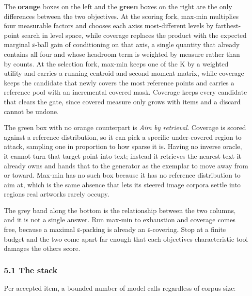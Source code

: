 \documentclass[
  11pt,
]{article}
\theoremstyle{plain}
\theoremstyle{definition}
\begin{document}
The \textbf{orange} boxes on the left and the \textbf{green} boxes on
the right are the only differences between the two objectives. At the
scoring fork, max-min multiplies four measurable factors and chooses
each axis\textquotesingle s most-different levels by farthest-point
search in level space, while coverage replaces the product with the
expected marginal ε-ball gain of conditioning on that axis, a single
quantity that already contains all four and whose headroom term is
weighted by measure rather than by counts. At the selection fork,
max-min keeps one of the K by a weighted utility and carries a running
centroid and second-moment matrix, while coverage keeps the candidate
that newly covers the most reference points and carries a reference pool
with an incremental covered mask. Coverage keeps every candidate that
clears the gate, since covered measure only grows with items and a
discard cannot be undone.

The green box with no orange counterpart is \emph{Aim by retrieval}.
Coverage is scored against a reference distribution, so it can pick a
specific under-covered region to attack, sampling one in proportion to
how sparse it is. Having no inverse oracle, it cannot turn that target
point into text; instead it retrieves the nearest text it already owns
and hands that to the generator as the exemplar to move away from or
toward. Max-min has no such box because it has no reference distribution
to aim at, which is the same absence that lets its steered image corpora
settle into regions real artworks rarely occupy.

The grey band along the bottom is the relationship between the two
columns, and it is not a single answer. Run max-min to exhaustion and
coverage comes free, because a maximal ε-packing is already an
ε-covering. Stop at a finite budget and the two come apart far enough
that each objective\textquotesingle s characteristic tool damages the
other\textquotesingle s score.

\subsubsection{5.1 The stack}\label{51-the-stack}

Per accepted item, a bounded number of model calls regardless of corpus
size:
\end{document}

